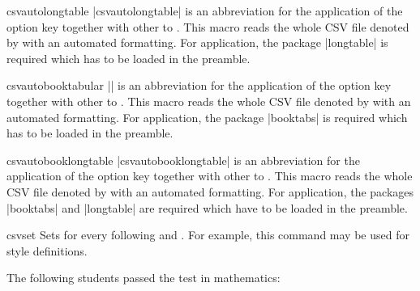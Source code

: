 \documentclass[a4paper,11pt]{ltxdoc}
\begin{document}
\begin{docCommand}{csvautolongtable}{}
  |csvautolongtable| is an abbreviation for the application of the option key
   together with other  to .
  This macro reads the whole CSV file denoted by 
  with an automated formatting.
  For application, the package |longtable| is required which has to be
  loaded in the preamble.
\begin{dispListing}
\end{dispListing}
\end{docCommand}

\clearpage

\begin{docCommand}{csvautobooktabular}{}
  |\csvautobooktabular| is an abbreviation for the application of the option key
   together with other  to .
  This macro reads the whole CSV file denoted by 
  with an automated formatting.
  For application, the package |booktabs| is required which has to be
  loaded in the preamble.
\begin{dispExample}
\end{dispExample}
\end{docCommand}


\begin{docCommand}{csvautobooklongtable}{}
  |csvautobooklongtable| is an abbreviation for the application of the option key
   together with other  to .
  This macro reads the whole CSV file denoted by 
  with an automated formatting.
  For application, the packages |booktabs| and |longtable| are required which have to be
  loaded in the preamble.
\begin{dispListing}
\end{dispListing}
\end{docCommand}



\clearpage

\begin{docCommand}{csvset}{}
  Sets  for every following
   and . For example, this command may
  be used for style definitions.
\begin{dispExample}

The following students passed the test in mathematics:
%
\end{dispExample}
\end{docCommand}
\end{document}
